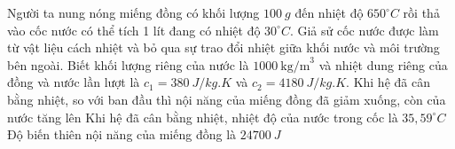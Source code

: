 \begin{ex}
	Người ta nung nóng miếng đồng có khối lượng $100\ g$ đến nhiệt độ $650^\circ C$ rồi thả vào cốc nước có thể tích 1 lít đang có nhiệt độ $30^\circ C$. Giả sử cốc nước được làm từ vật liệu cách nhiệt và bỏ qua sự trao đổi nhiệt giữa khối nước và môi trường bên ngoài. Biết khối lượng riêng của nước là $1000\ \text{kg/m}^3$ và nhiệt dung riêng của đồng và nước lần lượt là $c_1 = 380\ J/kg.K$ và $c_2 = 4180\ J/kg.K$.
	{\True Khi hệ đã cân bằng nhiệt, so với ban đầu thì nội năng của miếng đồng đã giảm xuống, còn của nước tăng lên}
	{\True Khi hệ đã cân bằng nhiệt, nhiệt độ của nước trong cốc là $35,59^\circ C$}
	{Độ biến thiên nội năng của miếng đồng là $24700\ J$}
\end{ex}

